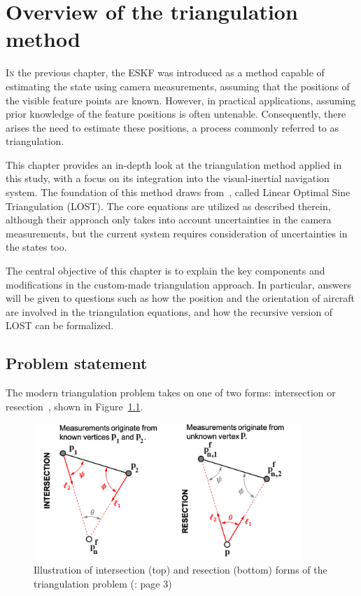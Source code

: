 \chapter{Overview of the triangulation method}\label{chap:LOST}

\lettrine{I}{n} the previous chapter, the ESKF was introduced as a method capable of estimating the state using camera measurements, assuming that the positions of the visible feature points are known. However, in practical applications, assuming prior knowledge of the feature positions is often untenable. Consequently, there arises the need to estimate these positions, a process commonly referred to as triangulation.

This chapter provides an in-depth look at the triangulation method applied in this study, with a focus on its integration into the visual-inertial navigation system. The foundation of this method draws from~\cite{absolute-triangulation}, called Linear Optimal Sine Triangulation (LOST). The core equations are utilized as described therein, although their approach only takes into account uncertainties in the camera measurements, but the current system requires consideration of uncertainties in the states too.

The central objective of this chapter is to explain the key components and modifications in the custom-made triangulation approach. In particular, answers will be given to questions such as how the position and the orientation of aircraft are involved in the triangulation equations, and how the recursive version of LOST can be formalized.\@

\section{Problem statement}

The modern triangulation problem takes on one of two forms: intersection or resection~\cite{ResectionInSurvey_1918}, shown in Figure~\ref{fig:intersec-resec}.

\begin{figure}[!ht]
    \centering
    \includegraphics[width=0.9\textwidth]{figures/intersec-resec.png}
    \caption{Illustration of intersection (top) and resection (bottom) forms of the triangulation problem (\cite{absolute-triangulation}: page 3)}\label{fig:intersec-resec}
\end{figure}

